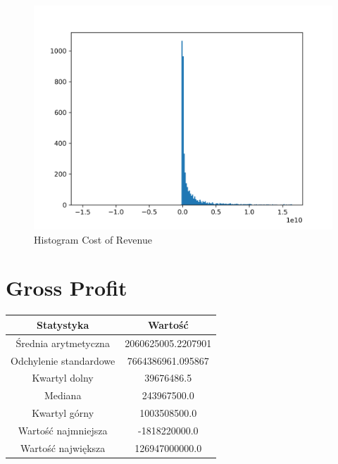 \documentclass{article}
\begin{document}
\begin{figure}[h!]
    \includegraphics[width=\linewidth]{variables/Cost of Revenue.png}
    \caption{Histogram Cost of Revenue }
\end{figure}\section{ Gross Profit }

\begin{center}
    \begin{tabular}{|c | c|} 
    \hline
    Statystyka & Wartość \\
    \hline\hline
    Średnia arytmetyczna & 2060625005.2207901 \\ 
    \hline
    Odchylenie standardowe & 7664386961.095867 \\
    \hline
    Kwartyl dolny & 39676486.5 \\
    \hline
    Mediana & 243967500.0 \\
    \hline
    Kwartyl górny & 1003508500.0 \\
    \hline
    Wartość najmniejsza & -1818220000.0 \\
    \hline
    Wartość największa & 126947000000.0 \\
    \hline
   \end{tabular}
\end{center}
\end{document}
